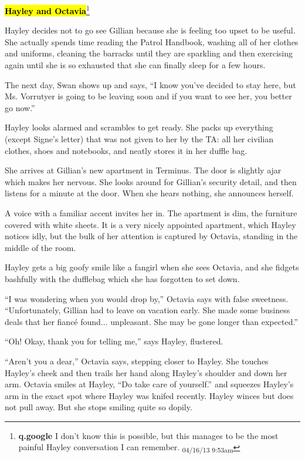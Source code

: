 \textbf{\hl{Hayley and Octavia}}\footnote{\textbf{q.google }I don't know this is possible, but this manages to be the most painful Hayley conversation I can remember. \textsubscript{04/16/13 9:53am}}

Hayley decides not to go see Gillian because she is feeling too upset to be useful.  She actually spends time reading the Patrol Handbook, washing all of her clothes and uniforms, cleaning the barracks until they are sparkling and then exercising again until she is so exhausted that she can finally sleep for a few hours.  



The next day, Swan shows up and says, ``I know you've decided to stay here, but Ms. Vorrutyer is going to be leaving soon and if you want to see her, you better go now.''

Hayley looks alarmed and scrambles to get ready.  She packs up everything (except Signe's letter) that was not given to her by the TA: all her civilian clothes, shoes and notebooks, and neatly stores it in her duffle bag.



She arrives at Gillian's new apartment in Terminus.  The door is slightly ajar which makes her nervous.  She looks around for Gillian's security detail, and then listens for a minute at the door.  When she hears nothing, she announces herself.  



A voice with a familiar accent invites her in.  The apartment is dim, the furniture covered with white sheets.  It is a very nicely appointed apartment, which Hayley notices idly, but the bulk of her attention is captured by Octavia, standing in the middle of the room.



Hayley gets a big goofy smile like a fangirl when she sees Octavia, and she fidgets bashfully with the dufflebag which she has forgotten to set down.



``I was wondering when you would drop by,'' Octavia says with false sweetness.  ``Unfortunately, Gillian had to leave on vacation early.  She made some business deals that her fiancé found... unpleasant.  She may be gone longer than expected.''

``Oh!  Okay, thank you for telling me,'' says Hayley, flustered.  

``Aren't you a dear,'' Octavia says, stepping closer to Hayley.  She touches Hayley's cheek and then trails her hand along Hayley's shoulder and down her arm.  Octavia smiles at Hayley, ``Do take care of yourself.'' and squeezes Hayley's arm in the exact spot where Hayley was knifed recently.  Hayley winces but does not pull away.  But she stops smiling quite so dopily.

